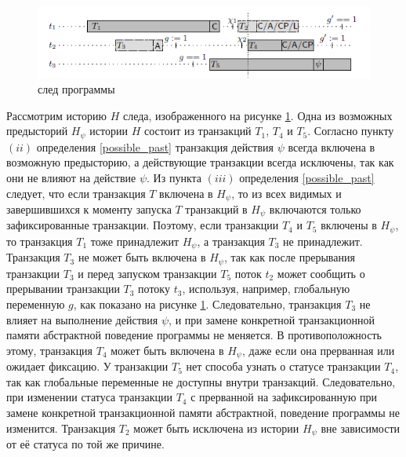 \begin{figure}
\centering
\includegraphics[width=\textwidth]{img/trace.png}
\caption{\label{fig:trace} след программы} 
\end{figure}

Рассмотрим историю $H$ следа, изображенного на рисунке \ref{fig:trace}. Одна из возможных предысторий $H_{\psi}$ истории $H$ состоит из транзакций $T_1$, $T_4$ и $T_5$. Согласно пункту $(ii)$ определения \ref{possible_past} транзакция действия $\psi$ всегда включена в возможную предысторию, а действующие транзакции всегда исключены, так как они не влияют на действие $\psi$. Из пункта $(iii)$ определения \ref{possible_past} следует, что если транзакция $T$ включена в $H_{\psi}$, то из всех видимых и завершившихся к моменту запуска $T$ транзакций в $H_{\psi}$ включаются только зафиксированные транзакции. Поэтому, если транзакции $T_4$ и $T_5$ включены в $H_{\psi}$, то транзакция $T_1$ тоже принадлежит $H_{\psi}$, а транзакция $T_3$ не принадлежит. Транзакция $T_3$ не может быть включена в $H_{\psi}$, так как после прерывания транзакции $T_3$ и перед запуском транзакции $T_5$ поток $t_2$ может сообщить о прерывании транзакции $T_3$ потоку $t_3$, используя, например, глобальную переменную $g$, как показано на рисунке \ref{fig:trace}. Следовательно, транзакция $T_3$ не влияет на выполнение действия $\psi$, и при замене конкретной транзакционной памяти абстрактной поведение программы не меняется. В противоположность этому, транзакция $T_4$ может быть включена в $H_{\psi}$, даже если она прерванная или ожидает фиксацию. У транзакции $T_5$ нет способа узнать о статусе транзакции $T_4$, так как глобальные переменные не доступны внутри транзакций. Следовательно, при изменении статуса транзакции $T_4$ с прерванной на зафиксированную при замене конкретной транзакционной памяти абстрактной, поведение программы не изменится. Транзакция $T_2$ может быть исключена из истории $H_{\psi}$ вне зависимости от её статуса по той же причине. 

